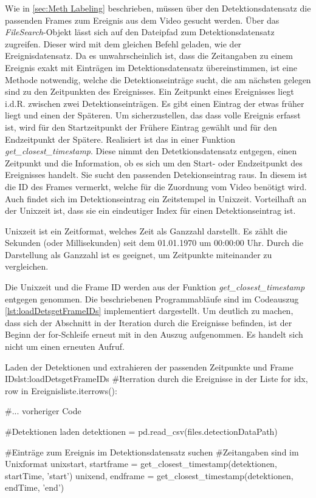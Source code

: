 Wie in \autoref{sec:Meth Labeling} beschrieben, müssen über den Detektionsdatensatz die passenden Frames zum Ereignis aus dem Video gesucht werden. Über das \textit{FileSearch}-Objekt lässt sich auf den Dateipfad zum Detektionsdatensatz zugreifen. Dieser wird mit dem gleichen Befehl geladen, wie der Ereignisdatensatz. Da es unwahrscheinlich ist, dass die Zeitangaben zu einem Ereignis exakt mit Einträgen im Detektionsdatensatz übereinstimmen, ist eine Methode notwendig, welche die Detektionseinträge sucht, die am nächsten gelegen sind zu den Zeitpunkten des Ereignisses. Ein Zeitpunkt eines Ereignisses liegt i.d.R. zwischen zwei Detektionseinträgen. Es gibt einen Eintrag der etwas früher liegt und einen der Späteren. Um sicherzustellen, das dass volle Ereignis erfasst ist, wird für den Startzeitpunkt der Frühere Eintrag gewählt und für den Endzeitpunkt der Spätere. Realisiert ist das in einer Funktion \textit{get\_closest\_timestamp}. Diese nimmt den Detetkionsdatensatz entgegen, einen Zeitpunkt und die Information, ob es sich um den Start- oder Endzeitpunkt des Ereignisses handelt. Sie sucht den passenden Detekionseintrag raus. In diesem ist die ID des Frames vermerkt, welche für die Zuordnung vom Video benötigt wird. Auch findet sich im Detektionseintrag ein Zeitstempel in Unixzeit. Vorteilhaft an der Unixzeit ist, dass sie ein eindeutiger Index für einen Detektionseintrag ist. \par

Unixzeit ist ein Zeitformat, welches Zeit als Ganzzahl darstellt. Es zählt die Sekunden (oder Millisekunden) seit dem 01.01.1970 um 00:00:00 Uhr. Durch die Darstellung als Ganzzahl ist es geeignet, um Zeitpunkte miteinander zu vergleichen.  \par

Die Unixzeit und die Frame ID werden aus der Funktion \textit{get\_closest\_timestamp} entgegen genommen. Die beschriebenen Programmabläufe sind im Codeauszug \ref{lst:loadDetsgetFrameIDs} implementiert dargestellt. Um deutlich zu machen, dass sich der Abschnitt in der Iteration durch die Ereignisse befinden, ist der Beginn der for-Schleife erneut mit in den Auszug aufgenommen. Es handelt sich nicht um einen erneuten Aufruf.

\begin{pythoncode}{Laden der Detektionen und extrahieren der passenden Zeitpunkte und Frame IDs}{lst:loadDetsgetFrameIDs}
#Iterration durch die Ereignisse in der Liste
for idx, row in Ereignisliste.iterrows():  

    #... vorheriger Code

    #Detektionen laden
    detektionen = pd.read_csv(files.detectionDataPath)

    #Einträge zum Ereignis im Detektionsdatensatz suchen
    #Zeitangaben sind im Unixformat
    unixstart, startframe = get_closest_timestamp(detektionen, startTime, 'start') 
    unixend, endframe = get_closest_timestamp(detektionen, endTime, 'end')
\end{pythoncode}

